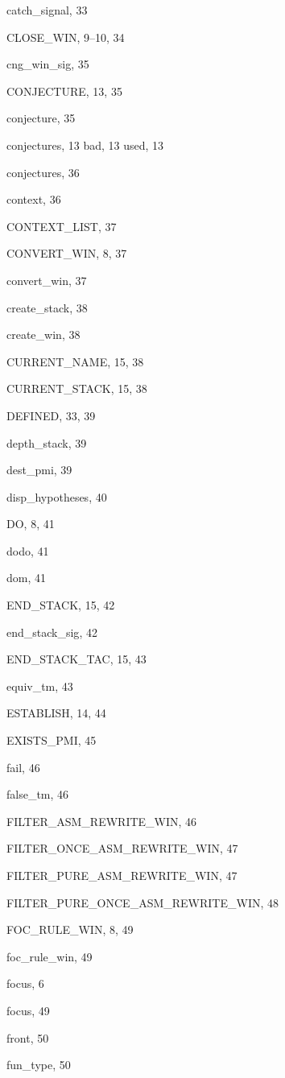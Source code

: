 \begin{theindex}
  \item {\ptt catch\_signal}, 33
  \item {\ptt CLOSE\_WIN}, 9--10, 34
  \item {\ptt cng\_win\_sig}, 35
  \item {\ptt CONJECTURE}, 13, 35
  \item {\ptt conjecture}, 35
  \item conjectures, 13
    \subitem bad, 13
    \subitem used, 13
  \item {\ptt conjectures}, 36
  \item {\ptt context}, 36
  \item {\ptt CONTEXT\_LIST}, 37
  \item {\ptt CONVERT\_WIN}, 8, 37
  \item {\ptt convert\_win}, 37
  \item {\ptt create\_stack}, 38
  \item {\ptt create\_win}, 38
  \item {\ptt CURRENT\_NAME}, 15, 38
  \item {\ptt CURRENT\_STACK}, 15, 38

  \indexspace

  \item {\ptt DEFINED}, 33, 39
  \item {\ptt depth\_stack}, 39
  \item {\ptt dest\_pmi}, 39
  \item {\ptt disp\_hypotheses}, 40
  \item {\ptt DO}, 8, 41
  \item {\ptt dodo}, 41
  \item {\ptt dom}, 41

  \indexspace

  \item {\ptt END\_STACK}, 15, 42
  \item {\ptt end\_stack\_sig}, 42
  \item {\ptt END\_STACK\_TAC}, 15, 43
  \item {\ptt equiv\_tm}, 43
  \item {\ptt ESTABLISH}, 14, 44
  \item {\ptt EXISTS\_PMI}, 45

  \indexspace

  \item {\ptt fail}, 46
  \item {\ptt false\_tm}, 46
  \item {\ptt FILTER\_ASM\_REWRITE\_WIN}, 46
  \item {\ptt FILTER\_ONCE\_ASM\_REWRITE\_WIN}, 47
  \item {\ptt FILTER\_PURE\_ASM\_REWRITE\_WIN}, 47
  \item {\ptt FILTER\_PURE\_ONCE\_ASM\_REWRITE\_WIN}, 48
  \item {\ptt FOC\_RULE\_WIN}, 8, 49
  \item {\ptt foc\_rule\_win}, 49
  \item focus, 6
  \item {\ptt focus}, 49
  \item {\ptt front}, 50
  \item {\ptt fun\_type}, 50


\end{theindex}
